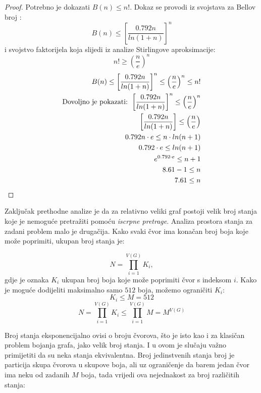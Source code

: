 \documentclass[times, utf8, diplomski, numeric]{fer}
\begin{document}
\begin{proof}
	Potrebno je dokazati $B(n) \le n!$. Dokaz se provodi iz svojstava za Bellov broj \cite{lit20}:
	\[ B(n) \le \left [ \frac{0.792 n}{ln(1+n)} \right ]^n \] 
	i svojstvo faktorijela koja slijedi iz analize Stirlingove aproksimacije: \[ n!\ge \left ( \frac{n}{e} \right )^n \]
	\begin{align}
		B(n) \le \left [ \frac{0.792 n}{ln(1+n)} \right ]^n \le \left ( \frac{n}{e} \right )^n \le n! \\
		\textup{Dovoljno je pokazati: } \left [ \frac{0.792 n}{ln(1+n)} \right ]^n \le \left ( \frac{n}{e} \right )^n \\
		\left [ \frac{0.792 n}{ln(1+n)} \right ] \le \left ( \frac{n}{e} \right ) \\
		0.792 n\cdot e \le n \cdot ln(n+1) \\
		0.792\cdot e \le ln(n+1) \\
		e^{0.792\cdot e} \le n+1 \\
		8.61 -1 \le n \\
		7.61 \le n
	\end{align}
\end{proof}

Zaključak prethodne analize je da za relativno veliki graf postoji velik broj stanja koje je nemoguće pretražiti pomoću \emph{iscrpne pretrage}. Analiza prostora stanja za zadani problem malo je drugačija. Kako svaki čvor ima konačan broj boja koje može poprimiti, ukupan broj stanja je:

\begin{equation}
N = \prod_{i=1}^{V(G)} K_i,
\end{equation}
gdje je oznaka $K_i$ ukupan broj boja koje može poprimiti čvor s indeksom $i$. Kako je moguće dodijeliti maksimalno samo $512$ boja, možemo ograničiti $K_i$:
\begin{equation}
K_i \le M = 512
\end{equation}
\begin{equation}
N = \prod_{i=1}^{V(G)} K_i \le \prod_{i=1}^{V(G)} M = M^{V(G)}
\end{equation}

Broj stanja eksponencijalno ovisi o broju čvorova, što je isto kao i za klasičan problem bojanja grafa, jako velik broj stanja. I u ovom je slučaju važno primijetiti da su neka stanja ekvivalentna. Broj jedinstvenih stanja broj je particija skupa čvorova u skupove boja, ali uz ograničenje da barem jedan čvor ima neku od zadanih $M$ boja, tada vrijedi ova nejednakost za broj različitih stanja:
\end{document}
